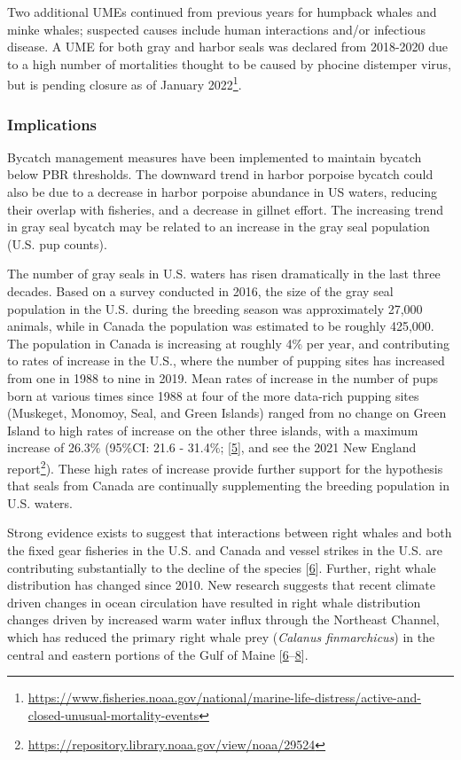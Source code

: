 \documentclass[
  10pt,
]{article}
\begin{document}
Two additional UMEs continued from previous years for humpback whales
and minke whales; suspected causes include human interactions and/or
infectious disease. A UME for both gray and harbor seals was declared
from 2018-2020 due to a high number of mortalities thought to be caused
by phocine distemper virus, but is pending closure as of January
2022\footnote{\url{https://www.fisheries.noaa.gov/national/marine-life-distress/active-and-closed-unusual-mortality-events}}.

\hypertarget{implications-5}{%
\subsubsection{Implications}\label{implications-5}}

Bycatch management measures have been implemented to maintain bycatch
below PBR thresholds. The downward trend in harbor porpoise bycatch
could also be due to a decrease in harbor porpoise abundance in US
waters, reducing their overlap with fisheries, and a decrease in gillnet
effort. The increasing trend in gray seal bycatch may be related to an
increase in the gray seal population (U.S. pup counts).

The number of gray seals in U.S. waters has risen dramatically in the
last three decades. Based on a survey conducted in 2016, the size of the
gray seal population in the U.S. during the breeding season was
approximately 27,000 animals, while in Canada the population was
estimated to be roughly 425,000. The population in Canada is increasing
at roughly 4\% per year, and contributing to rates of increase in the
U.S., where the number of pupping sites has increased from one in 1988
to nine in 2019. Mean rates of increase in the number of pups born at
various times since 1988 at four of the more data-rich pupping sites
(Muskeget, Monomoy, Seal, and Green Islands) ranged from no change on
Green Island to high rates of increase on the other three islands, with
a maximum increase of 26.3\% (95\%CI: 21.6 - 31.4\%;
{[}\protect\hyperlink{ref-wood_rates_2020}{5}{]}, and see the 2021 New
England report\footnote{\url{https://repository.library.noaa.gov/view/noaa/29524}}).
These high rates of increase provide further support for the hypothesis
that seals from Canada are continually supplementing the breeding
population in U.S. waters.

Strong evidence exists to suggest that interactions between right whales
and both the fixed gear fisheries in the U.S. and Canada and vessel
strikes in the U.S. are contributing substantially to the decline of the
species {[}\protect\hyperlink{ref-hayes_north_2018}{6}{]}. Further,
right whale distribution has changed since 2010. New research suggests
that recent climate driven changes in ocean circulation have resulted in
right whale distribution changes driven by increased warm water influx
through the Northeast Channel, which has reduced the primary right whale
prey (\emph{Calanus finmarchicus}) in the central and eastern portions
of the Gulf of Maine
{[}\protect\hyperlink{ref-hayes_north_2018}{6}--\protect\hyperlink{ref-sorochan_north_2019}{8}{]}.
\end{document}
